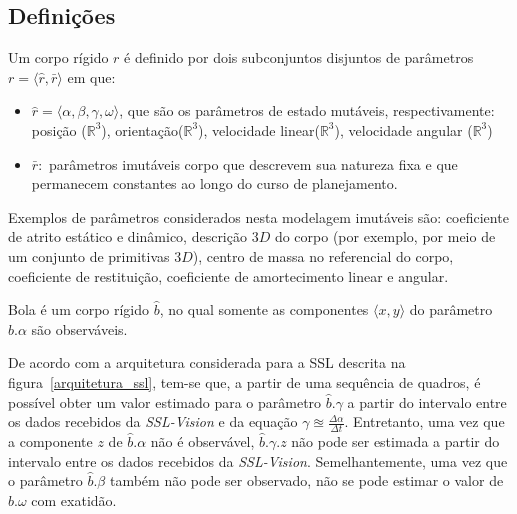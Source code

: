 \subsection{Definições}


\begin{defi}
  Um corpo rígido $r$ é definido por dois subconjuntos disjuntos
  de parâmetros $r= \langle \hat{r}, \bar{r} \rangle$ em que:
  \begin{itemize}
    \item $\hat{r} = \langle \alpha, \beta, \gamma, \omega \rangle$,
    que são os parâmetros de estado mutáveis, respectivamente:
    posição ($\mathbb{R} ^{3}$), orientação($\mathbb{R} ^{3}$),
    velocidade linear($\mathbb{R} ^{3}$), velocidade angular
    ($\mathbb{R} ^{3}$)

    \item $\bar{r} :$ parâmetros imutáveis corpo que descrevem sua
    natureza fixa e que permanecem constantes ao longo do curso de 
    planejamento.
  \end{itemize}
\end{defi}

  Exemplos de parâmetros considerados nesta modelagem imutáveis são:
  coeficiente de atrito estático e dinâmico, descrição $3D$ do corpo
  (por exemplo, por meio de um conjunto de primitivas $3D$), centro de
  massa no referencial do corpo, coeficiente de restituição,
  coeficiente de amortecimento linear e angular.

\begin{defi}[Bola]\label{def:bola}
  Bola é um corpo rígido $\hat{b}$, no qual somente as componentes 
  $\langle x,y \rangle$ do parâmetro $\hat{b}.\alpha$ são
  observáveis.
\end{defi}

  De acordo com a  arquitetura considerada para a SSL descrita na
  figura~\ref{arquitetura_ssl}, tem-se que, a partir de uma sequência
  de quadros, é possível obter um valor estimado para o parâmetro
  $\hat{b}.\gamma$ a partir do intervalo entre os dados recebidos
  da \textit{SSL-Vision} e da equação $ \gamma \approxeq 
  \frac{\Delta \alpha}{\Delta t} $. Entretanto, uma vez que a componente
  $z$ de $\hat{b}.\alpha$ não é observável, $\hat{b}.\gamma.z$ 
  não pode ser estimada a partir do intervalo entre os dados recebidos
  da \textit{SSL-Vision}. Semelhantemente,  uma vez que o
  parâmetro $\hat{b}.\beta$ também não pode ser observado,
  não se pode estimar o valor de $\hat{b}.\omega$ com exatidão.

